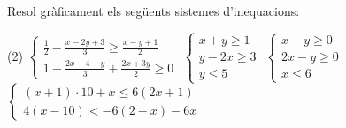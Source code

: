 \begin{mylist}
\exer  Resol gràficament els següents sistemes d'inequacions:
  \begin{tasks}(2)
\task $\left\{\begin{array}{c} {\frac{1}{2} -\frac{x-2y+3}{3} \ge \frac{x-y+1}{2} } \\ {1-\frac{2x-4-y}{3} +\frac{2x+3y}{2} \ge 0} \end{array}\right. $  
 \task $\left\{\begin{array}{c} {x+y\ge 1} \\ {y-2x\ge 3} \\ {y\le 5} \end{array}\right. $  
 \task $\left\{\begin{array}{c} {x+y\ge 0} \\ {2x-y\ge 0} \\ {x\le 6} \end{array}\right. $  
 \task $\left\{\begin{array}{c} {(x+1)\cdot 10+x\le 6(2x+1)} \\ {4(x-10)<-6(2-x)-6x} \end{array}\right. $
 \end{tasks}


\end{mylist}
